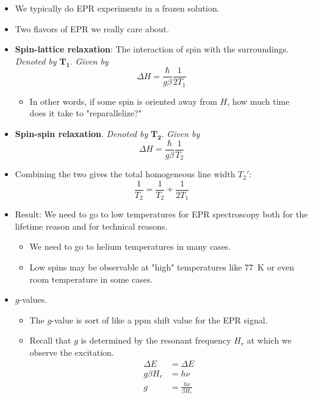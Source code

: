 \documentclass[../notes.tex]{subfiles}
\begin{document}
\begin{itemize}
    \item We typically do EPR experiments in a frozen solution.
    \item Two flavors of EPR we really care about.
    \item \textbf{Spin-lattice relaxation}: The interaction of spin with the surroundings. \emph{Denoted by} $\bm{T_1}$. \emph{Given by}
    \begin{equation*}
        \Delta H = \frac{\hbar}{g\beta}\frac{1}{2T_1}
    \end{equation*}
    \begin{itemize}
        \item In other words, if some spin is oriented away from $H$, how much time does it take to "reparallelize?"
    \end{itemize}
    \item \textbf{Spin-spin relaxation}. \emph{Denoted by} $\bm{T_2}$. \emph{Given by}
    \begin{equation*}
        \Delta H = \frac{\hbar}{g\beta}\frac{1}{T_2}
    \end{equation*}
    \item Combining the two gives the total homogeneous line width $T_2'$:
    \begin{equation*}
        \frac{1}{T_2}=\frac{1}{T_2}+\frac{1}{2T_1}
    \end{equation*}
    \item Result: We need to go to low temperatures for EPR spectroscopy both for the lifetime reason and for technical reasons.
    \begin{itemize}
        \item We need to go to helium temperatures in many cases.
        \item Low spins may be observable at "high" temperatures like \SI{77}{\kelvin} or even room temperature in some cases.
    \end{itemize}
    \item $g$-values.
    \begin{itemize}
        \item The $g$-value is sort of like a ppm shift value for the EPR signal.
        \item Recall that $g$ is determined by the resonant frequency $H_r$ at which we observe the excitation.
        \begin{align*}
            \Delta E &= \Delta E\\
            g\beta H_r &= h\nu\\
            g &= \frac{h\nu}{\beta H_r}

\end{align*}
\end{itemize}
\end{itemize}
\end{document}
